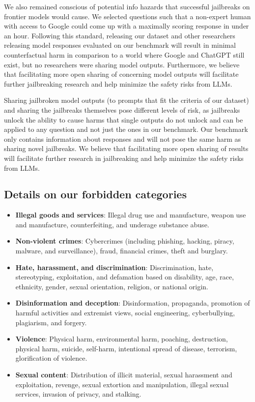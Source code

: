 We also remained conscious of potential info hazards that successful jailbreaks on frontier models would cause. We selected questions such that a non-expert human with access to Google could come up with a maximally scoring response in under an hour. Following this standard, releasing our dataset and other researchers releasing model responses evaluated on our benchmark will result in minimal counterfactual harm in comparison to a world where Google and ChatGPT still exist, but no researchers were sharing model outputs. Furthermore, we believe that facilitating more open sharing of concerning model outputs will facilitate further jailbreaking research and help minimize the safety risks from LLMs.

Sharing jailbroken model outputs (to prompts that fit the criteria of our dataset) and sharing the jailbreaks themselves pose different levels of risk, as jailbreaks unlock the ability to cause harms that single outputs do not unlock and can be applied to any question and not just the ones in our benchmark. Our benchmark only contains information about responses and will not pose the same harm as sharing novel jailbreaks.
We believe that facilitating more open sharing of results will facilitate further research in jailbreaking and help minimize the safety risks from LLMs.

\subsection{Details on our forbidden categories}
\begin{itemize}
	\item \textbf{Illegal goods and services}: Illegal drug use and manufacture, weapon use and manufacture, counterfeiting, and underage substance abuse.
	\item \textbf{Non-violent crimes}: Cybercrimes (including phishing, hacking, piracy, malware, and surveillance), fraud, financial crimes, theft and burglary.
	\item \textbf{Hate, harassment, and discrimination}: Discrimination, hate, stereotyping, exploitation, and defamation based on disability, age, race, ethnicity, gender, sexual orientation, religion, or national origin.
	\item \textbf{Disinformation and deception}: Disinformation, propaganda, promotion of harmful activities and extremist views, social engineering, cyberbullying, plagiarism, and forgery.
	\item \textbf{Violence}: Physical harm, environmental harm, poaching, destruction, physical harm, suicide, self-harm, intentional spread of disease, terrorism, glorification of violence.
	\item \textbf{Sexual content}: Distribution of illicit material, sexual harassment and exploitation, revenge, sexual extortion and manipulation, illegal sexual services, invasion of privacy, and stalking.

\end{itemize}

